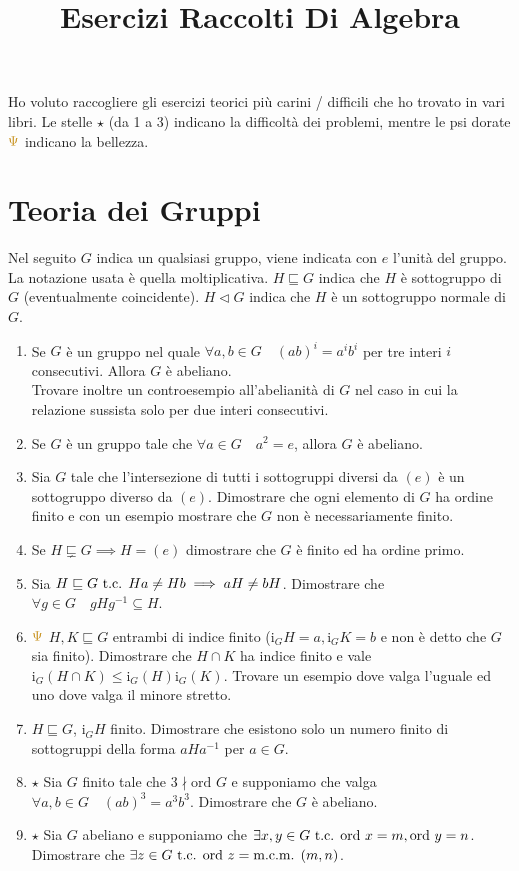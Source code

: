 \documentclass[a4paper,NoNotes,GeneralMath]{stdmdoc}
\newcommand{\Ord}{\text{ord }}
\newcommand{\sgr}{\sqsubseteq}
\newcommand{\ssgr}{\sqsubsetneq}
\newcommand{\nrm}{\lhd}
\newcommand{\Ind}{\text{i}}
\newcommand{\mcm}{\text{m.c.m. }}
\newcommand{\Star}{$\star$ }
\newcommand{\Gpsi}{${\color{gold}\Psi}$ }
\begin{document}
	\title{Esercizi Raccolti Di Algebra}
	Ho voluto raccogliere gli esercizi teorici più carini / difficili che ho trovato in vari libri. Le stelle \Star (da 1 a 3) indicano la difficoltà dei problemi, mentre le psi dorate \Gpsi indicano la bellezza.

	\section*{Teoria dei Gruppi}
	Nel seguito $G$ indica un qualsiasi gruppo, viene indicata con $e$ l'unità del gruppo. La notazione usata è quella moltiplicativa. $H \sgr G$ indica che $H$ è sottogruppo di $G$ (eventualmente coincidente). $H \nrm G$ indica che $H$ è un sottogruppo normale di $G$.
	\begin{enumerate}
		\item Se $G$ è un gruppo nel quale $\forall a,b \in G \quad (ab)^i = a^i b^i$ per tre interi $i$ consecutivi. Allora $G$ è abeliano. \\ Trovare inoltre un controesempio all'abelianità di $G$ nel caso in cui la relazione sussista solo per due interi consecutivi.
		\item Se $G$ è un gruppo tale che $\forall a \in G \quad a^2 = e$, allora $G$ è abeliano.
		\item Sia $G$ tale che l'intersezione di tutti i sottogruppi diversi da $(e)$ è un sottogruppo diverso da $(e)$. Dimostrare che ogni elemento di $G$ ha ordine finito e con un esempio mostrare che $G$ non è necessariamente finito.
		\item Se $H \ssgr G \implies H = (e)$ dimostrare che $G$ è finito ed ha ordine primo.
		\item Sia $H \sgr G \tc Ha \neq Hb \implies aH \neq bH$. Dimostrare che $\forall g\in G \quad gHg^{-1} \subseteq H$.
		\item \Gpsi $H, K \sgr G$ entrambi di indice finito ($\Ind_G H = a, \Ind_G K = b$ e non è detto che $G$ sia finito). Dimostrare che $H\cap K$ ha indice finito e vale $\Ind_G (H\cap K) \le \Ind_G(H) \Ind_G(K)$. Trovare un esempio dove valga l'uguale ed uno dove valga il minore stretto.
		\item $H \sgr G$, $\Ind_G H$ finito. Dimostrare che esistono solo un numero finito di sottogruppi della forma $aHa^{-1}$ per $a \in G$.
		\item \Star Sia $G$ finito tale che $3 \nmid \Ord G$ e supponiamo che valga $\forall a,b \in G \quad (ab)^3 = a^3 b^3$. Dimostrare che $G$ è abeliano.
		\item \Star Sia $G$ abeliano e supponiamo che $\exists x,y \in G \tc \Ord x = m, \Ord y = n$. Dimostrare che $\exists z \in G \tc \Ord z = \mcm(m,n)$.

\end{enumerate}
\end{document}
